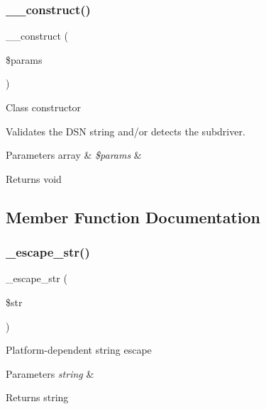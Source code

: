 \subsubsection{\texorpdfstring{\+\_\+\+\_\+construct()}{\_\_construct()}}
{\footnotesize\ttfamily \+\_\+\+\_\+construct (\begin{DoxyParamCaption}\item[{}]{\$params }\end{DoxyParamCaption})}

Class constructor

Validates the D\+SN string and/or detects the subdriver.


\begin{DoxyParams}[1]{Parameters}
array & {\em \$params} & \\
\hline
\end{DoxyParams}
\begin{DoxyReturn}{Returns}
void 
\end{DoxyReturn}


\subsection{Member Function Documentation}
\mbox{\label{class_c_i___d_b__pdo__driver_af8ef0237bfcdb19215b63fff769e7a55}} 
\subsubsection{\texorpdfstring{\+\_\+escape\+\_\+str()}{\_escape\_str()}}
{\footnotesize\ttfamily \+\_\+escape\+\_\+str (\begin{DoxyParamCaption}\item[{}]{\$str }\end{DoxyParamCaption})\hspace{0.3cm}{\ttfamily [protected]}}

Platform-\/dependent string escape


\begin{DoxyParams}{Parameters}
{\em string} & \\
\hline
\end{DoxyParams}
\begin{DoxyReturn}{Returns}
string 
\end{DoxyReturn}
\mbox{\label{class_c_i___d_b__pdo__driver_a114ab675d89bf8324a41785fb475e86d}} 
